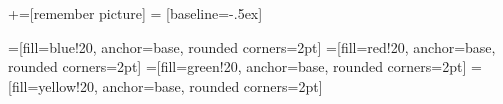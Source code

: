 \usepackage{tikz}
\usetikzlibrary{shadows.blur}
\usetikzlibrary{arrows,shapes,shapes.callouts,decorations.pathmorphing,backgrounds}
+=[remember picture]
 = [baseline=-.5ex]

=[fill=blue!20, anchor=base, rounded corners=2pt]
=[fill=red!20, anchor=base, rounded corners=2pt]
=[fill=green!20, anchor=base, rounded corners=2pt]
=[fill=yellow!20, anchor=base, rounded corners=2pt]

\newcommand{\CloudNote}[3]{
  \begin{tikzpicture}[overlay,remember picture, every text node part/.style={align=center}]
    \pgftransformshift{\pgfpointanchor{current page}{center}}
    \node[
    starburst,
    draw=black,
    ultra thick,
    fill=magenta,
    text width=#1,
    align=center,
    anchor=center,
    blur shadow={shadow blur steps=5}
    ] at (#2) {#3};
  \end{tikzpicture}
}


